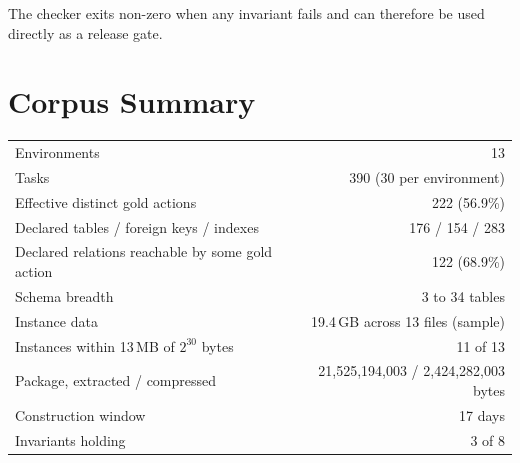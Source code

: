 \documentclass[11pt,letterpaper]{article}
\theoremstyle{definition}
\theoremstyle{plain}
\theoremstyle{remark}
\begin{document}
The checker exits non-zero when any invariant fails and can therefore be used directly as a
release gate.

\section{Corpus Summary}
\label{app:corpus}

\begin{center}\small
\begin{tabular}{@{}lr@{}}
\toprule
Environments & 13 \\
Tasks & 390 (30 per environment) \\
Effective distinct gold actions & 222 (56.9\%) \\
Declared tables / foreign keys / indexes & 176 / 154 / 283 \\
Declared relations reachable by some gold action & 122 (68.9\%) \\
Schema breadth & 3 to 34 tables \\
Instance data & 19.4\,GB across 13 files (sample) \\
Instances within 13\,MB of $2^{30}$ bytes & 11 of 13 \\
Package, extracted / compressed & 21{,}525{,}194{,}003 / 2{,}424{,}282{,}003 bytes \\
Construction window & 17 days \\
Invariants holding & 3 of 8 \\
\bottomrule
\end{tabular}
\end{center}
\end{document}
